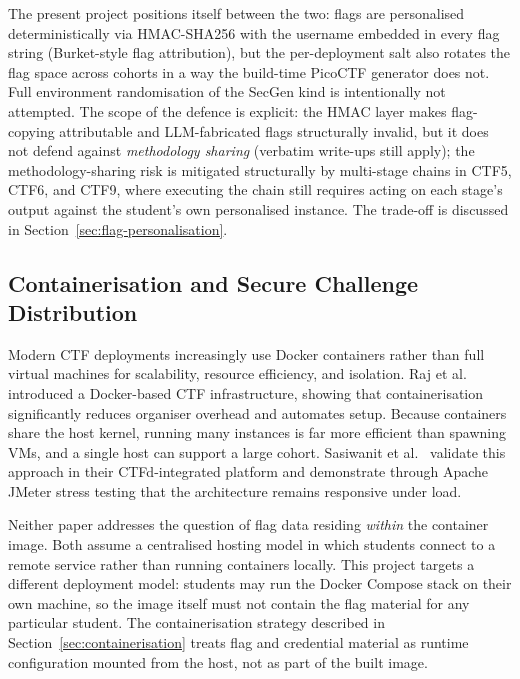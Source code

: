 The present project positions itself between the two: flags
are personalised deterministically via HMAC-SHA256 with the
username embedded in every flag string (Burket-style flag
attribution), but the per-deployment salt also rotates the
flag space across cohorts in a way the build-time PicoCTF
generator does not. Full environment randomisation of the
SecGen kind is intentionally not attempted. The scope of the
defence is explicit: the HMAC layer makes flag-copying
attributable and LLM-fabricated flags structurally invalid,
but it does not defend against \emph{methodology sharing}
(verbatim write-ups still apply); the methodology-sharing risk
is mitigated structurally by multi-stage chains in CTF5, CTF6,
and CTF9, where executing the chain still requires acting on
each stage's output against the student's own personalised
instance. The trade-off is discussed in
Section~\ref{sec:flag-personalisation}.


\subsection{Containerisation and Secure Challenge Distribution}
Modern CTF deployments increasingly use Docker containers rather
than full virtual machines for scalability, resource efficiency,
and isolation. Raj et al.~\cite{raj2016} introduced a Docker-based
CTF infrastructure, showing that containerisation significantly
reduces organiser overhead and automates setup. Because containers
share the host kernel, running many instances is far more efficient
than spawning VMs, and a single host can support a large cohort.
Sasiwanit et al.~\cite{Sasiwanit} validate this approach in their
CTFd-integrated platform and demonstrate through Apache JMeter
stress testing that the architecture remains responsive under load.

Neither paper addresses the question of flag data residing
\textit{within} the container image. Both assume a centralised
hosting model in which students connect to a remote service rather
than running containers locally. This project targets a different
deployment model: students may run the Docker Compose stack on
their own machine, so the image itself must not contain the flag
material for any particular student. The containerisation strategy
described in Section~\ref{sec:containerisation} treats flag and
credential material as runtime configuration mounted from the host,
not as part of the built image.


